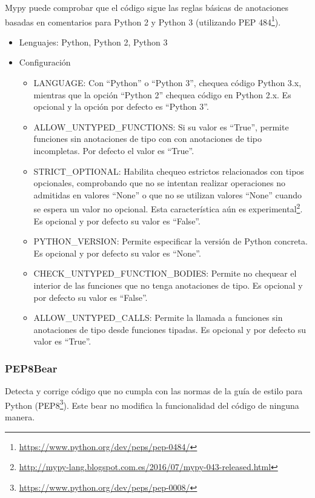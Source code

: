 \documentclass[a4paper, 12pt]{book}
\begin{document}
Mypy puede comprobar que el código sigue las reglas básicas de anotaciones basadas en comentarios para Python 2 y Python 3 (utilizando PEP 484\footnote{\url{https://www.python.org/dev/peps/pep-0484/}}).

\begin{itemize}
  \item Lenguajes: Python, Python 2, Python 3
  \item Configuración
    \begin{itemize}
          \item LANGUAGE: Con “Python” o “Python 3”, chequea código Python 3.x, mientras que la opción “Python 2” chequea código en Python 2.x. Es opcional y la opción por defecto es “Python 3”.
          \item ALLOW\_UNTYPED\_FUNCTIONS: Si su valor es “True”, permite funciones sin anotaciones de tipo con con anotaciones de tipo incompletas. Por defecto el valor es “True”.
          \item STRICT\_OPTIONAL: Habilita chequeo estrictos relacionados con tipos opcionales, comprobando que no se intentan realizar operaciones no admitidas en valores “None” o que no se utilizan valores “None” cuando se espera un valor no opcional. Esta característica aún es experimental\footnote{\url{http://mypy-lang.blogspot.com.es/2016/07/mypy-043-released.html}}. Es opcional y por defecto su valor es “False”.
          \item PYTHON\_VERSION: Permite especificar la versión de Python concreta. Es opcional y por defecto su valor es “None”.
          \item CHECK\_UNTYPED\_FUNCTION\_BODIES: Permite no chequear el interior de las funciones que no tenga anotaciones de tipo. Es opcional y por defecto su valor es “False”.
          \item ALLOW\_UNTYPED\_CALLS: Permite la llamada a funciones sin anotaciones de tipo desde funciones tipadas. Es opcional y por defecto su valor es “True”.
    \end{itemize}
\end{itemize}

\subsubsection{PEP8Bear}
\label{sec:seccion1.2.5}
Detecta y corrige código que no cumpla con las normas de la guía de estilo para Python (PEP8\footnote{\url{https://www.python.org/dev/peps/pep-0008/}}). Este bear no modifica la funcionalidad del código de ninguna manera.
\end{document}
